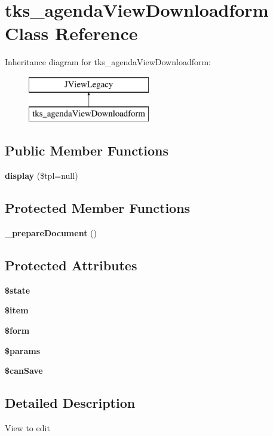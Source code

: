 \section{tks\+\_\+agenda\+View\+Downloadform Class Reference}
\label{classtks__agenda_view_downloadform}
Inheritance diagram for tks\+\_\+agenda\+View\+Downloadform\+:\begin{figure}[H]
\begin{center}
\leavevmode
\includegraphics[height=2.000000cm]{classtks__agenda_view_downloadform}
\end{center}
\end{figure}
\subsection*{Public Member Functions}
\begin{DoxyCompactItemize}
\item 
\textbf{ display} (\$tpl=null)
\end{DoxyCompactItemize}
\subsection*{Protected Member Functions}
\begin{DoxyCompactItemize}
\item 
\textbf{ \+\_\+prepare\+Document} ()
\end{DoxyCompactItemize}
\subsection*{Protected Attributes}
\begin{DoxyCompactItemize}
\item 
\textbf{ \$state}
\item 
\textbf{ \$item}
\item 
\textbf{ \$form}
\item 
\textbf{ \$params}
\item 
\textbf{ \$can\+Save}
\end{DoxyCompactItemize}


\subsection{Detailed Description}
View to edit

